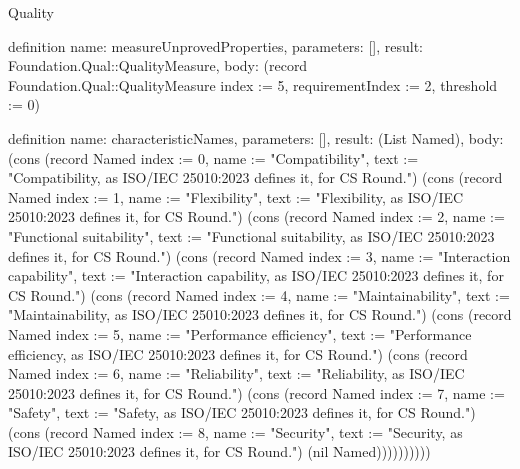 \begin{lexlean}{Quality}
\begin{semanticmodule}
definition{
  name: measureUnprovedProperties,
  parameters: [],
  result: Foundation.Qual::QualityMeasure,
  body: (record Foundation.Qual::QualityMeasure {index := 5, requirementIndex := 2, threshold := 0})
}

definition{
  name: characteristicNames,
  parameters: [],
  result: (List Named),
  body: (cons (record Named {index := 0, name := "Compatibility", text := "Compatibility, as ISO/IEC 25010:2023 defines it, for CS Round."}) (cons (record Named {index := 1, name := "Flexibility", text := "Flexibility, as ISO/IEC 25010:2023 defines it, for CS Round."}) (cons (record Named {index := 2, name := "Functional suitability", text := "Functional suitability, as ISO/IEC 25010:2023 defines it, for CS Round."}) (cons (record Named {index := 3, name := "Interaction capability", text := "Interaction capability, as ISO/IEC 25010:2023 defines it, for CS Round."}) (cons (record Named {index := 4, name := "Maintainability", text := "Maintainability, as ISO/IEC 25010:2023 defines it, for CS Round."}) (cons (record Named {index := 5, name := "Performance efficiency", text := "Performance efficiency, as ISO/IEC 25010:2023 defines it, for CS Round."}) (cons (record Named {index := 6, name := "Reliability", text := "Reliability, as ISO/IEC 25010:2023 defines it, for CS Round."}) (cons (record Named {index := 7, name := "Safety", text := "Safety, as ISO/IEC 25010:2023 defines it, for CS Round."}) (cons (record Named {index := 8, name := "Security", text := "Security, as ISO/IEC 25010:2023 defines it, for CS Round."}) (nil Named))))))))))
}


\end{semanticmodule}
\end{lexlean}
